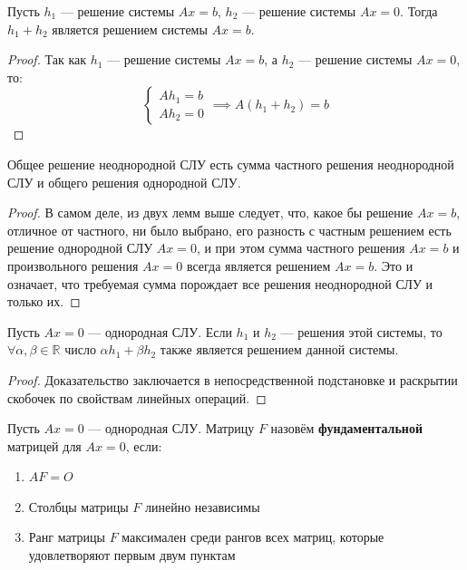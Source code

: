 \documentclass[11pt]{article}
\begin{document}
\begin{lemma}
    Пусть $h_1$ --- решение системы $Ax = b$, $h_2$ --- решение системы $Ax = 0$. Тогда 
    $h_1 + h_2$ является решением системы $Ax = b$.
\end{lemma}

\begin{proof}
    Так как $h_1$ --- решение системы $Ax = b$, а $h_2$ --- решение системы $Ax = 0$, то:
    \begin{equation*}
        \begin{cases}
            A h_1 = b \\
            A h_2 = 0
        \end{cases}
        \implies
        A (h_1 + h_2) = b
    \end{equation*}
\end{proof}

\begin{theorem}
    Общее решение неоднородной СЛУ есть сумма частного решения неоднородной СЛУ и общего решения однородной СЛУ.
\end{theorem}

\begin{proof}
    В самом деле, из двух лемм выше следует, что, какое бы решение $Ax = b$, отличное от частного, ни было выбрано, его 
    разность с частным решением есть решение однородной СЛУ $Ax = 0$, и при этом сумма частного решения $Ax = b$ и произвольного 
    решения $Ax = 0$ всегда является решением $Ax = b$. Это и означает, что требуемая сумма порождает все решения неоднородной СЛУ и только их.
\end{proof}

\begin{lemma}
    Пусть $Ax = 0$ --- однородная СЛУ. Если $h_1$ и $h_2$ --- решения этой системы, то $\forall \alpha, \beta \in \mathbb{R}$ число
    $\alpha h_1 + \beta h_2$ также является решением данной системы.
\end{lemma}

\begin{proof}
    Доказательство заключается в непосредственной подстановке и раскрытии скобочек по свойствам линейных операций.
\end{proof}

\begin{definition}
    Пусть $Ax = 0$ --- однородная СЛУ. Матрицу $F$ назовём \textbf{фундаментальной} матрицей для $Ax = 0$, если:
    \begin{enumerate}
        \item $AF = O$
        \item Столбцы матрицы $F$ линейно независимы
        \item Ранг матрицы $F$ максимален среди рангов всех матриц, которые удовлетворяют первым двум пунктам
    \end{enumerate}
\end{definition}
\end{document}
